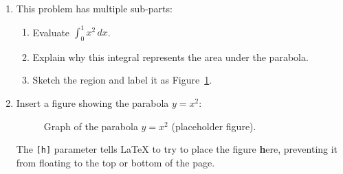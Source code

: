 \documentclass[11pt]{article}
\begin{document}
\begin{enumerate}
  \item This problem has multiple sub-parts:
  \begin{enumerate}
    \item Evaluate $\int_{0}^{1} x^2\,dx$.
    \item Explain why this integral represents the area under the parabola.
    \item Sketch the region and label it as Figure~\ref{fig:parabola}.
  \end{enumerate}
  
  \item Insert a figure showing the parabola $y = x^2$:
  \begin{figure}[h]
    \centering
    \fbox{\rule{0pt}{1.2in}\rule{1.8in}{0pt}}
    \caption{Graph of the parabola $y = x^2$ (placeholder figure).}
    \label{fig:parabola}
  \end{figure}
  The \verb|[h]| parameter tells LaTeX to try to place the figure \textbf{h}ere, preventing it from floating to the top or bottom of the page.
  
\end{enumerate}
\end{document}
